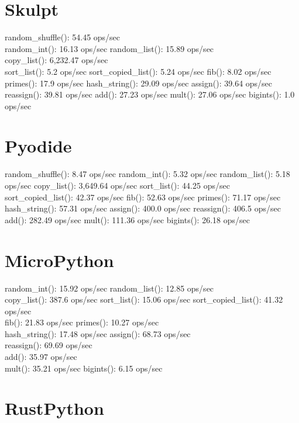 \chapter{Skulpt}\label{notes__03010-python-web.md__skulpt}

random\_shuffle(): 54.45 ops/sec\\
random\_int(): 16.13 ops/sec
random\_list(): 15.89 ops/sec\\
copy\_list(): 6,232.47 ops/sec\\
sort\_list(): 5.2 ops/sec
sort\_copied\_list(): 5.24 ops/sec
fib(): 8.02 ops/sec
primes(): 17.9 ops/sec
hash\_string(): 29.09 ops/sec
assign(): 39.64 ops/sec
reassign(): 39.81 ops/sec
add(): 27.23 ops/sec
mult(): 27.06 ops/sec
bigints(): 1.0 ops/sec

\chapter{Pyodide}\label{notes__03010-python-web.md__pyodide}

random\_shuffle(): 8.47 ops/sec
random\_int(): 5.32 ops/sec
random\_list(): 5.18 ops/sec
copy\_list(): 3,649.64 ops/sec
sort\_list(): 44.25 ops/sec
sort\_copied\_list(): 42.37 ops/sec
fib(): 52.63 ops/sec
primes(): 71.17 ops/sec
hash\_string(): 57.31 ops/sec
assign(): 400.0 ops/sec
reassign(): 406.5 ops/sec
add(): 282.49 ops/sec
mult(): 111.36 ops/sec
bigints(): 26.18 ops/sec

\chapter{MicroPython}\label{notes__03010-python-web.md__micropython}

random\_int(): 15.92 ops/sec
random\_list(): 12.85 ops/sec\\
copy\_list(): 387.6 ops/sec
sort\_list(): 15.06 ops/sec
sort\_copied\_list(): 41.32 ops/sec\\
fib(): 21.83 ops/sec
primes(): 10.27 ops/sec\\
hash\_string(): 17.48 ops/sec
assign(): 68.73 ops/sec\\
reassign(): 69.69 ops/sec\\
add(): 35.97 ops/sec\\
mult(): 35.21 ops/sec
bigints(): 6.15 ops/sec

\chapter{RustPython}\label{notes__03010-python-web.md__rustpython}

